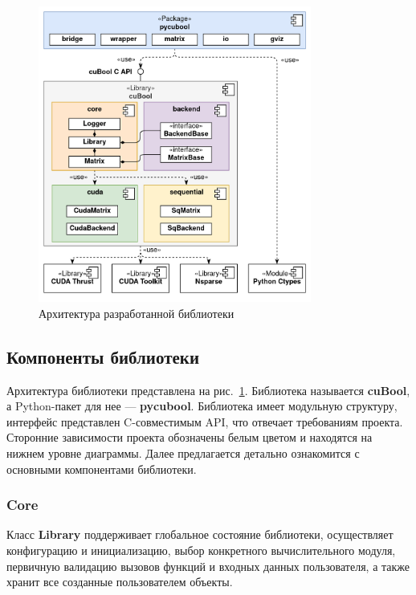 \begin{figure}[h]
    \centering
    \includegraphics[width=0.8\textwidth]{images/library_architecture.png}
    \caption{Архитектура разработанной библиотеки}
    \label{fig:cubool_architecture}
\end{figure}

\subsection{Компоненты библиотеки}

Архитектура библиотеки представлена на рис.~\ref{fig:cubool_architecture}.
Библиотека называется \textbf{cuBool}, а Python-пакет для нее --- \textbf{pycubool}. 
Библиотека имеет модульную структуру, интерфейс представлен C-совместимым API, что отвечает требованиям проекта.
Сторонние зависимости проекта обозначены белым цветом и находятся на нижнем уровне диаграммы. 
Далее предлагается детально ознакомится с основными компонентами библиотеки.

\subsubsection*{Core}

Класс \textbf{Library} поддерживает глобальное состояние библиотеки, осуществляет конфигурацию и инициализацию, выбор конкретного вычислительного модуля, первичную валидацию вызовов функций и входных данных пользователя, 
а также хранит все созданные пользователем объекты. 

